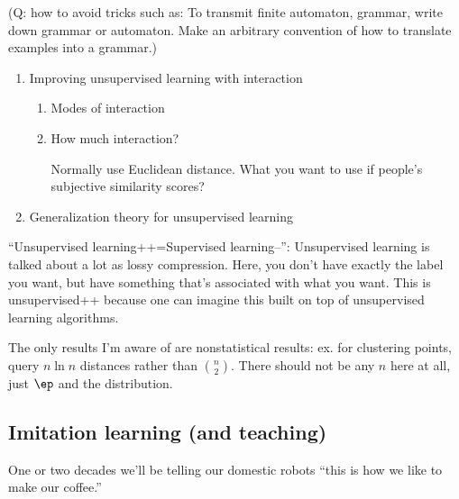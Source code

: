 
(Q: how to avoid tricks such as: To transmit finite automaton, grammar, write down grammar or automaton. Make an arbitrary convention of how to translate examples into a grammar.)


\begin{enumerate}
\item
Improving unsupervised learning with interaction
\begin{enumerate}
\item
Modes of interaction
\item
How much interaction?

Normally use Euclidean distance. What you want to use if people's subjective similarity scores?
\end{enumerate}
\item
Generalization theory for unsupervised learning
\end{enumerate}
``Unsupervised learning++=Supervised learning--'': %
Unsupervised learning is talked about a lot as lossy compression. Here, you don't have exactly the label you want, but have something that's associated with what you want.
This is unsupervised++ because one can imagine this built on top of unsupervised learning algorithms.

The only results I'm aware of are nonstatistical results: ex. for clustering points, query $n\ln n$ distances rather than $\binom n2$. %
There should not be any $n$ here at all, just $\ep$ and the distribution. 



\subsection{Imitation learning (and teaching)}

One or two decades we'll be telling our domestic robots ``this is how we like to make our coffee.''


